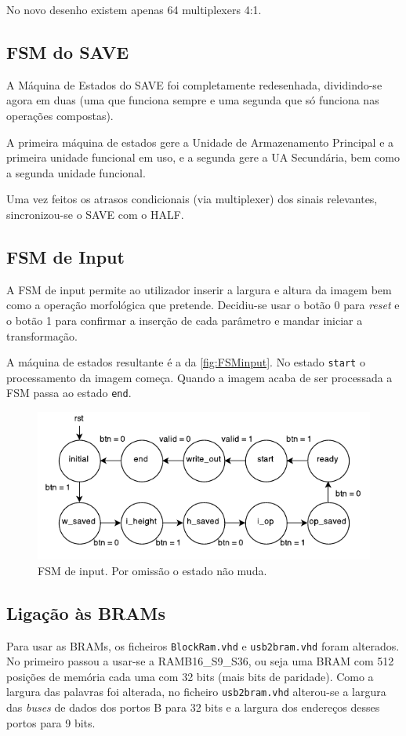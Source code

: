 \documentclass[a4paper]{article}
\begin{document}
No novo desenho existem apenas 64 multiplexers 4:1.


\subsection*{FSM do SAVE}

A Máquina de Estados do SAVE foi completamente redesenhada, dividindo-se agora em duas (uma que funciona sempre e uma segunda que só funciona nas operações compostas).

A primeira máquina de estados gere a Unidade de Armazenamento Principal e a primeira unidade funcional em uso, e a segunda gere a UA Secundária, bem como a segunda unidade funcional.

Uma vez feitos os atrasos condicionais (via multiplexer) dos sinais relevantes, sincronizou-se o SAVE com o HALF.

\subsection*{FSM de Input}

A FSM de input permite ao utilizador inserir a largura e altura da imagem bem como a operação morfológica que pretende. Decidiu-se usar o botão 0 para \textit{reset} e o botão 1 para confirmar a inserção de cada parâmetro e mandar iniciar a transformação.

A máquina de estados resultante é a da \autoref{fig:FSMinput}. No estado \texttt{start} o processamento da imagem começa. Quando a imagem acaba de ser processada a FSM passa ao estado \texttt{end}.

\begin{figure}
	\centering
	\includegraphics[width=\textwidth]{controlo_FSM}
	\caption{FSM de input. Por omissão o estado não muda.}
	\label{fig:FSMinput}
\end{figure}

\subsection*{Ligação às BRAMs}
Para usar as BRAMs, os ficheiros \texttt{BlockRam.vhd} e \texttt{usb2bram.vhd} foram alterados. No primeiro passou a usar-se a RAMB16\_S9\_S36, ou seja uma BRAM com 512 posições de memória cada uma com 32 bits (mais bits de paridade). Como a largura das palavras foi alterada, no ficheiro \texttt{usb2bram.vhd} alterou-se a largura das \textit{buses} de dados dos portos B para 32 bits e a largura dos endereços desses portos para 9 bits.
\end{document}
